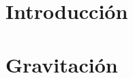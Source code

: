 \documentclass[12pt,a4paper]{book}
\begin{document}
\frontmatter%


\newpage{\pagestyle{empty}\cleardoublepage} %
%
%
\newpage{\pagestyle{empty}\cleardoublepage}
\tableofcontents %
\mainmatter
\chapter{Introducción}


\chapter{Gravitación}

\end{document}
